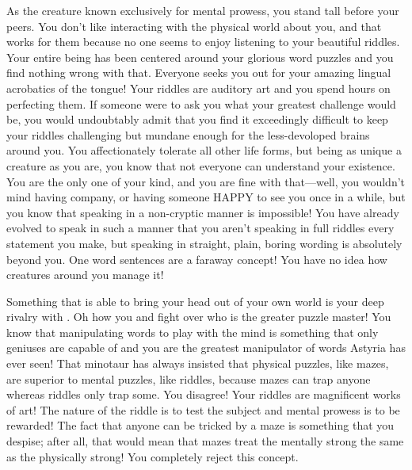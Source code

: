\documentclass[char]{guildcamp2}
\begin{document}
\name{\cSphinx{}}


As the creature known exclusively for mental prowess, you stand tall before your peers. You don't like interacting with the physical world about you, and that works for them because no one seems to enjoy listening to your beautiful riddles. Your entire being has been centered around your glorious word puzzles and you find nothing wrong with that. Everyone seeks you out for your amazing lingual acrobatics of the tongue! Your riddles are auditory art and you spend hours on perfecting them. If someone were to ask you what your greatest challenge would be, you would undoubtably admit that you find it exceedingly difficult to keep your riddles challenging but mundane enough for the less-devoloped brains around you. You affectionately tolerate all other life forms, but being as unique a creature as you are, you know that not everyone can understand your existence. You are the only one of your kind, and you are fine with that---well, you wouldn't mind having company, or having someone HAPPY  to see you once in a while, but you know that speaking in a non-cryptic manner is impossible! You have already evolved to speak in such a manner that you aren't speaking in full riddles every statement you make, but speaking in straight, plain, boring wording is absolutely beyond you. One word sentences are a faraway concept! You have no idea how creatures around you manage it!

Something that is able to bring your head out of your own world is your deep rivalry with \cMinotaur{}. Oh how you and \cMinotaur{\they} fight over who is the greater puzzle master! You know that manipulating words to play with the mind is something that only geniuses are capable of and you are the greatest manipulator of words Astyria has ever seen! That minotaur has always insisted that physical puzzles, like mazes, are superior to mental puzzles, like riddles, because mazes can trap anyone whereas riddles only trap some. You disagree! Your riddles are magnificent works of art! The nature of the riddle is to test the subject and mental prowess is to be rewarded! The fact that anyone can be tricked by a maze is something that you despise; after all, that would mean that mazes treat the mentally strong the same as the physically strong! You completely reject this concept. 
\end{document}

